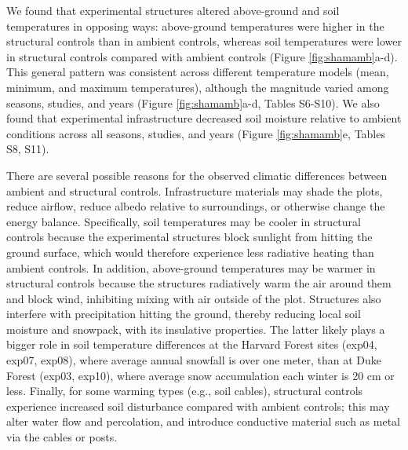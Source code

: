 \documentclass{article}
\begin{document}
\par We found that experimental structures altered above-ground and soil temperatures in opposing ways: above-ground temperatures were higher in the structural controls than in ambient controls, whereas soil temperatures were lower in structural controls compared with ambient controls (Figure \ref{fig:shamamb}a-d). This general pattern was consistent across different temperature models (mean, minimum, and maximum temperatures), although the magnitude varied among seasons, studies, and years (Figure \ref{fig:shamamb}a-d, Tables S6-S10). We also found that experimental infrastructure decreased soil moisture relative to ambient conditions across all seasons, studies, and years (Figure \ref{fig:shamamb}e, Tables S8, S11). 
\par There are several possible reasons for the observed climatic differences between ambient and structural controls. Infrastructure materials may shade the plots, reduce airflow, reduce albedo relative to surroundings, or otherwise change the energy balance. Specifically, soil temperatures may be cooler in structural controls because the experimental structures block sunlight from hitting the ground surface, which would therefore experience less radiative heating than ambient controls. In addition, above-ground temperatures may be warmer in structural controls because the structures radiatively warm the air around them and block wind, inhibiting mixing with air outside of the plot. Structures also interfere with precipitation hitting the ground, thereby reducing local soil moisture and snowpack, with its insulative properties. The latter likely plays a bigger role in soil temperature differences at the Harvard Forest sites (exp04, exp07, exp08), where average annual snowfall is over one meter, than at Duke Forest (exp03, exp10), where average snow accumulation each winter is 20 cm or less. Finally, for some warming types (e.g., soil cables), structural controls experience increased soil disturbance compared with ambient controls; this may  alter water flow and percolation, and introduce conductive material such as metal via the cables or posts.
\end{document}
